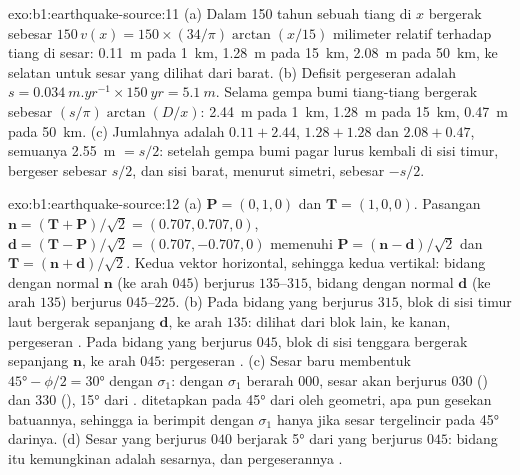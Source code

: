 \begin{solution}{exo:b1:earthquake-source:11}
(a) Dalam 150 tahun sebuah tiang di $x$ bergerak sebesar $150\,v(x) = 150\times(34/\pi)
\arctan(x/15)$ milimeter relatif terhadap tiang di sesar: \qty{0.11}{m} pada
\qty{1}{km}, \qty{1.28}{m} pada \qty{15}{km}, \qty{2.08}{m} pada \qty{50}{km},
ke selatan untuk sesar  yang dilihat dari barat. (b) Defisit pergeseran adalah
$s = \qty{0.034}{m.yr^{-1}}\times\qty{150}{yr} = \qty{5.1}{m}$. Selama gempa bumi tiang-tiang bergerak sebesar $(s/\pi)\arctan(D/x)$: \qty{2.44}{m} pada
\qty{1}{km}, \qty{1.28}{m} pada \qty{15}{km}, \qty{0.47}{m} pada \qty{50}{km}.
(c) Jumlahnya adalah $0.11 + 2.44$, $1.28 + 1.28$ dan $2.08 + 0.47$, semuanya
\qty{2.55}{m} $= s/2$: setelah gempa bumi pagar lurus kembali di sisi timur, bergeser sebesar $s/2$, dan sisi barat, menurut simetri, sebesar $-s/2$.
\end{solution}

\begin{solution}{exo:b1:earthquake-source:12}
(a) $\mathbf P = (0, 1, 0)$ dan $\mathbf T = (1, 0, 0)$. Pasangan
$\mathbf n = (\mathbf T + \mathbf P)/\sqrt2 = (0.707, 0.707, 0)$,
$\mathbf d = (\mathbf T - \mathbf P)/\sqrt2 = (0.707, -0.707, 0)$ memenuhi
$\mathbf P = (\mathbf n - \mathbf d)/\sqrt2$ dan $\mathbf T = (\mathbf n +
\mathbf d)/\sqrt2$. Kedua vektor horizontal, sehingga kedua  vertikal: bidang dengan normal $\mathbf n$ (ke arah $045$) berjurus $135$--$315$, bidang dengan normal $\mathbf d$ (ke arah $135$) berjurus $045$--$225$. (b) Pada bidang yang berjurus $315$, blok di sisi timur laut bergerak sepanjang $\mathbf d$, ke arah $135$: dilihat dari blok lain, ke kanan, pergeseran . Pada bidang yang berjurus $045$, blok di sisi tenggara bergerak sepanjang $\mathbf n$, ke arah $045$: pergeseran . (c) Sesar baru membentuk $\ang{45} - \phi/2 =
\ang{30}$ dengan $\sigma_1$: dengan $\sigma_1$ berarah $000$, sesar akan berjurus $030$ () dan $330$ (), \ang{15} dari .  ditetapkan pada \ang{45} dari  oleh geometri, apa pun gesekan batuannya, sehingga ia berimpit dengan $\sigma_1$ hanya jika sesar tergelincir pada \ang{45} darinya. (d) Sesar yang berjurus $040$ berjarak \ang{5} dari  yang berjurus $045$: bidang itu kemungkinan adalah sesarnya, dan pergeserannya .
\end{solution}

